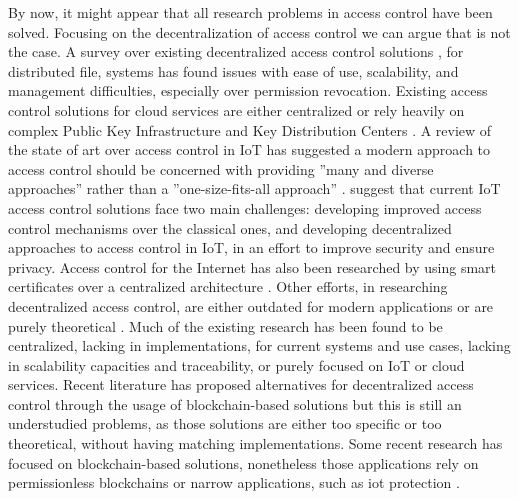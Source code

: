 By now, it might appear that all research problems in access control have been solved. Focusing on the decentralization of access control we can argue that is not the case. A survey over existing decentralized access control solutions \cite{miltchev_decentralized_2008}, for distributed file, systems has found issues with ease of use, scalability, and management difficulties, especially over permission revocation. Existing access control solutions for cloud services are either centralized \cite{calero_toward_2010, ruj_dacc:_2011, yu_achieving_2010} or rely heavily on complex Public Key Infrastructure and Key Distribution Centers \cite{ruj_privacy_2012, ruj_decentralized_2014,bauer_distributed_2005}. A review of the state of art over access control in IoT \cite{ouaddah_access_2017} has suggested a modern approach to access control should be concerned with providing ”many and diverse approaches” \cite[242]{ouaddah_access_2017} rather than a ”one-size-fits-all approach” \cite[242]{ouaddah_access_2017}. \citeauthor{ouaddah_access_2017} \cite{ouaddah_access_2017} suggest that current IoT access control solutions face two main challenges: developing improved access control mechanisms over the classical ones, and developing decentralized approaches to access control in IoT, in an effort to improve security and ensure privacy. Access control for the Internet has also been researched by using smart certificates over a centralized architecture \cite{park_smart_1999}. Other efforts, in researching decentralized access control, are either outdated for modern applications \cite{satyanarayanan_integrating_1989, karger_non-discretionary_1977} or are purely theoretical \cite{thomas_towards_1993}. Much of the existing research has been found to be centralized, lacking in implementations, for current systems and use cases, lacking in scalability capacities and traceability, or purely focused on IoT or cloud services. Recent literature has proposed alternatives for decentralized access control through the usage of blockchain-based solutions but this is still an understudied problems, as those solutions are either too specific or too theoretical, without having matching implementations. Some recent research has focused on blockchain-based solutions, nonetheless those applications rely on permissionless blockchains \cite{maesa_blockchain_2017} or narrow applications, such as \gls{iot} protection \cite{ouaddah_fairaccess:_2017}.

